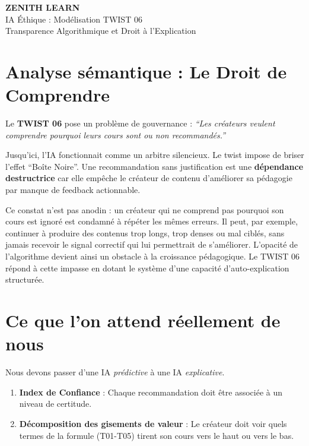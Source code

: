 \documentclass[11pt,a4paper]{article}
\begin{document}
\begin{tcolorbox}[enhanced, colback=BrandDark, colframe=BrandPrimary, arc=10pt, boxrule=2pt, halign=center]
    \vspace{0.3cm}
    {\Huge \bfseries \color{white} ZENITH LEARN} \\
    \vspace{0.2cm}
    {\Large \color{BrandPrimary} IA Éthique : Modélisation TWIST 06} \\
    \vspace{0.5cm}
    {\small \color{gray} Transparence Algorithmique et Droit à l'Explication}
    \vspace{0.3cm}
\end{tcolorbox}

\section{Analyse sémantique : Le Droit de Comprendre}
Le \textbf{TWIST 06} pose un problème de gouvernance : \textit{``Les créateurs veulent comprendre pourquoi leurs cours sont ou non recommandés.''}

Jusqu'ici, l'IA fonctionnait comme un arbitre silencieux. Le twist impose de briser l'effet ``Boîte Noire''. Une recommandation sans justification est une \textbf{dépendance destructrice} car elle empêche le créateur de contenu d'améliorer sa pédagogie par manque de feedback actionnable.

Ce constat n'est pas anodin : un créateur qui ne comprend pas pourquoi son cours est ignoré est condamné à répéter les mêmes erreurs. Il peut, par exemple, continuer à produire des contenus trop longs, trop denses ou mal ciblés, sans jamais recevoir le signal correctif qui lui permettrait de s'améliorer. L'opacité de l'algorithme devient ainsi un obstacle à la croissance pédagogique. Le TWIST 06 répond à cette impasse en dotant le système d'une capacité d'auto-explication structurée.

\section{Ce que l'on attend réellement de nous}
Nous devons passer d'une IA \textit{prédictive} à une IA \textit{explicative}.
\begin{enumerate}
    \item \textbf{Index de Confiance} : Chaque recommandation doit être associée à un niveau de certitude.
    \item \textbf{Décomposition des gisements de valeur} : Le créateur doit voir quels termes de la formule (T01-T05) tirent son cours vers le haut ou vers le bas.
\end{enumerate}
\end{document}
